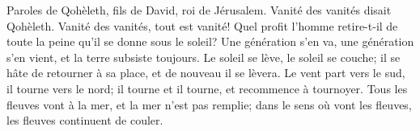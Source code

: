 Paroles de Qohèleth, fils de David, roi de Jérusalem.
Vanité des vanités disait Qohèleth.
	Vanité des vanités, tout est vanité!
Quel profit l’homme retire-t-il
		de toute la peine qu’il se donne sous le soleil?
Une génération s’en va, une génération s’en vient,
	et la terre subsiste toujours.
Le soleil se lève, le soleil se couche;
	il se hâte de retourner à sa place, et de nouveau il se lèvera.
Le vent part vers le sud, il tourne vers le nord;
	il tourne et il tourne, et recommence à tournoyer.
Tous les fleuves vont à la mer, et la mer n’est pas remplie;
	dans le sens où vont les fleuves, les fleuves continuent de couler.
